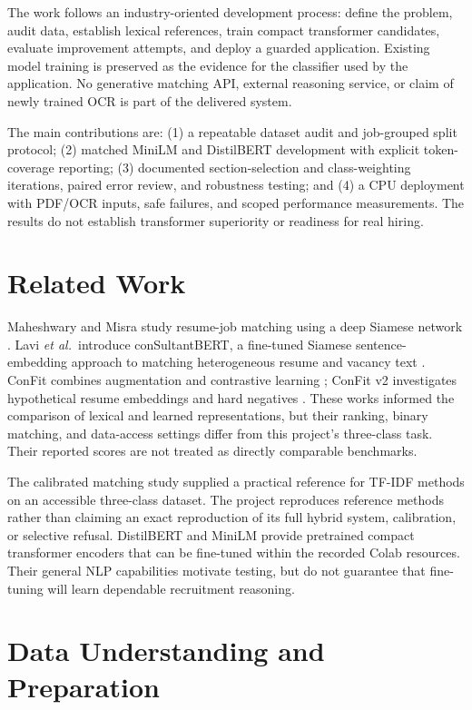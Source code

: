 \documentclass[conference,a4paper]{IEEEtran}
\begin{document}
The work follows an industry-oriented development process: define the problem, audit data, establish lexical references, train compact transformer candidates, evaluate improvement attempts, and deploy a guarded application. Existing model training is preserved as the evidence for the classifier used by the application. No generative matching API, external reasoning service, or claim of newly trained OCR is part of the delivered system.

The main contributions are: (1) a repeatable dataset audit and job-grouped split protocol; (2) matched MiniLM and DistilBERT development with explicit token-coverage reporting; (3) documented section-selection and class-weighting iterations, paired error review, and robustness testing; and (4) a CPU deployment with PDF/OCR inputs, safe failures, and scoped performance measurements. The results do not establish transformer superiority or readiness for real hiring.

\section{Related Work}
Maheshwary and Misra study resume-job matching using a deep Siamese network \cite{siamese}. Lavi \emph{et al.}\ introduce conSultantBERT, a fine-tuned Siamese sentence-embedding approach to matching heterogeneous resume and vacancy text \cite{consultant}. ConFit combines augmentation and contrastive learning \cite{confit}; ConFit v2 investigates hypothetical resume embeddings and hard negatives \cite{confit2}. These works informed the comparison of lexical and learned representations, but their ranking, binary matching, and data-access settings differ from this project's three-class task. Their reported scores are not treated as directly comparable benchmarks.

The calibrated matching study \cite{calibrated} supplied a practical reference for TF-IDF methods on an accessible three-class dataset. The project reproduces reference methods rather than claiming an exact reproduction of its full hybrid system, calibration, or selective refusal. DistilBERT \cite{distilbert} and MiniLM \cite{minilm} provide pretrained compact transformer encoders that can be fine-tuned within the recorded Colab resources. Their general NLP capabilities motivate testing, but do not guarantee that fine-tuning will learn dependable recruitment reasoning.

\section{Data Understanding and Preparation}
\end{document}
